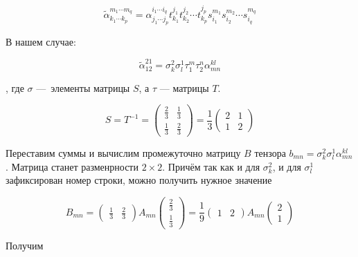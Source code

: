 \documentclass[12pt, a4paper]{article}
\begin{document}
    \begin{equation}
        {\tilde{\alpha}}^{m_1\cdots m_q}_{k_1\cdots k_p}=\alpha^{i_1\cdots i_q}_{j_1\cdots j_p}t_{k_1}^{j_1}t_{k_2}^{j_2}\cdots t_{k_p}^{j_p}s_{i_1}^{m_1}s_{i_2}^{m_2}\cdots s_{i_q}^{m_q}
    \end{equation}

    В нашем случае:

    \begin{equation}
        \tilde{\alpha}_{12}^{21}=\sigma_{k}^{2} \sigma_{l}^{1} \tau_{1}^{m} \tau_{2}^{n} \alpha_{m n}^{k l}
    \end{equation}

    , где $\sigma$ — элементы матрицы $S$, а $\tau$ — матрицы $T$.

    \begin{equation}
        S = T^{-1} = \left(\begin{matrix}
            \frac{2}{3} & \frac{1}{3} \\
            \frac{1}{3} & \frac{2}{3}
        \end{matrix}\right) = \frac{1}{3} \left(\begin{matrix}
            2 & 1 \\
            1 & 2
        \end{matrix}\right)
    \end{equation}

    Переставим суммы и вычислим промежуточно матрицу $B$ тензора $b_{mn} = \sigma_{k}^{2} \sigma_{l}^{1} \alpha_{m n}^{k l}$.
    Матрица станет разменрности $2 \times 2$. Причём так как и для $\sigma_{k}^{2}$, и для $\sigma_{l}^{1}$ зафиксирован номер строки, можно получить нужное значение
    
    \begin{equation}
        B_{mn} = 
        \begin{pmatrix} \frac{1}{3} & \frac{2}{3} \end{pmatrix} A_{mn} \begin{pmatrix} \frac{2}{3} \\ \frac{1}{3} \end{pmatrix} 
        = \frac{1}{9} \begin{pmatrix} 1 & 2 \end{pmatrix} A_{mn} \begin{pmatrix} 2 \\ 1 \end{pmatrix}
    \end{equation}

    Получим
    
\end{document}
